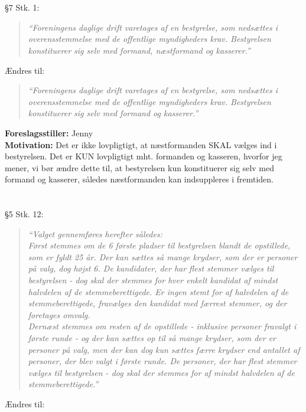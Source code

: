 \documentclass[a4paper,12pt,danish]{article}
\newcommand\cit[1]{
    \begin{quote}
        \textit{``#1''}
    \end{quote}
}
\newcommand\who[1]{
    \textbf{Foreslagsstiller:} #1\\
}
\newcommand\why[1]{
    \textbf{Motivation:} #1\\
}
\newcommand\change[1]{
    \section{}
    #1
}
\begin{document}
\change{
	\S7 Stk. 1:
    \cit{Foreningens daglige drift varetages af en bestyrelse, som nedsættes i overensstemmelse med de offentlige myndigheders krav. Bestyrelsen konstituerer sig selv med formand, næstformand og kasserer.}
    Ændres til:
    \cit{Foreningens daglige drift varetages af en bestyrelse, som nedsættes i overensstemmelse med de offentlige myndigheders krav. Bestyrelsen konstituerer sig selv med formand og kasserer.}
    \who{Jenny}
    \why{Det er ikke lovpligtigt, at næstformanden SKAL vælges ind i bestyrelsen. Det er KUN lovpligtigt mht. formanden og kasseren, hvorfor jeg mener, vi bør ændre dette til, at bestyrelsen kun konstituerer sig selv med formand og kasserer, således næstformanden kan indsuppleres i fremtiden.}
}

\change{
	\S5 Stk. 12:
    \cit{Valget gennemføres herefter således:\\
Først stemmes om de 6 første pladser til bestyrelsen blandt de opstillede, som er fyldt 25 år. Der kan sættes så mange krydser, som der er personer på valg, dog højst 6. De kandidater, der har flest stemmer vælges til bestyrelsen - dog skal der stemmes for hver enkelt kandidat af mindst halvdelen af de stemmeberettigede. Er ingen stemt for af halvdelen af de stemmeberettigede, fravælges den kandidat med færrest stemmer, og der foretages omvalg.\\
Dernæst stemmes om resten af de opstillede - inklusive personer fravalgt i første runde - og der kan sættes op til så mange krydser, som der er personer på valg, men der kan dog kun sættes færre krydser end antallet af personer, der blev valgt i første runde. De personer, der har flest stemmer vælges til bestyrelsen - dog skal der stemmes for af mindst halvdelen af de stemmeberettigede.}
    Ændres til:

}
\end{document}
